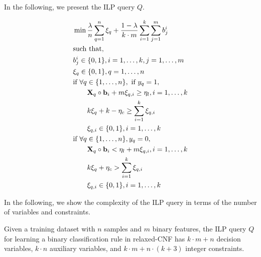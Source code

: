 In the following, we present the ILP query $ Q $.


\begin{subequations}
	\label{interpretability_crr_eq:ilp}
 \begin{align} 	
 	&\min   \frac{\lambda}{n} \sum_{q=1}^n \xi_q + \frac{1-\lambda}{k\cdot m}\sum_{i=1}^k\sum_{j=1}^m b_j^i \label{interpretability_crr_eq:ilp_obj} \\
 	&\text{such that,} \notag \\
 	&b_j^i \in \{0,1\},  i = 1,\dots,k,  j = 1,\dots,m \label{interpretability_crr_eq:ilp_range}\\
 	& \xi_q \in \{0,1\},q = 1,\dots,n  \label{interpretability_crr_eq:ilp_range_2}\\
 	&\text{if }  \forall q \in \{1,\dots,n\},\text{ if }  y_q=1, \label{interpretability_crr_eq:ilp_pos}\\
 	&\qquad {\mathbf{X}}_q\circ \mathbf{b}_i+ m\xi_{q,i} \ge \eta_{l},  i = 1,\dots,k  \label{interpretability_crr_eq:ilp_ela_l_pos}\\
 	& \qquad   k\xi_q + k-\eta_c \ge \sum_{i=1}^k \xi_{q,i} \notag \\ &\qquad \xi_{q,i} \in \{0,1\},  i = 1,\dots,k \notag\\
 	&\text{if } \forall q \in \{1,\dots,n\}, y_q=0, \label{interpretability_crr_eq:ilp_neg}\\
 	&\qquad {\mathbf{X}}_q\circ \mathbf{b}_i < \eta_{l} + m  \xi_{q,i},  i = 1,\dots,k \label{interpretability_crr_eq:ilp_ela_l_neg}\\
 	&\qquad  k\xi_q  + \eta_{c} > \sum_{i=1}^k\xi_{q,i} \notag\\ &\qquad \xi_{q,i} \in \{0,1\},  i = 1,\dots,k \notag
\end{align}
\end{subequations}

In the following, we show the complexity of the ILP query in terms of the number of variables and constraints. 

\begin{proposition}
	Given a training dataset with $ n $ samples and $ m $ binary features, the ILP query $ Q $ for learning a binary classification rule in relaxed-CNF has $ k\cdot m + n $ decision variables, $ k\cdot n $ auxiliary variables, and  $ k\cdot m + n\cdot (k+3)  $ integer constraints. 
\end{proposition}

